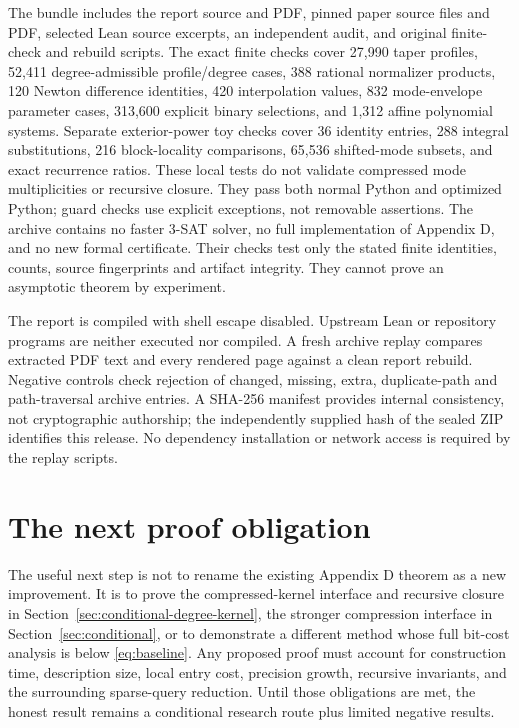\documentclass[11pt,letterpaper]{article}
\theoremstyle{remark}\newtheorem*{scope}{Scope}
\begin{document}
The bundle includes the report source and PDF, pinned paper source files and PDF, selected Lean source excerpts, an independent audit, and original finite-check and rebuild scripts. The exact finite checks cover 27,990 taper profiles, 52,411 degree-admissible profile/degree cases, 388 rational normalizer products, 120 Newton difference identities, 420 interpolation values, 832 mode-envelope parameter cases, 313,600 explicit binary selections, and 1,312 affine polynomial systems. Separate exterior-power toy checks cover 36 identity entries, 288 integral substitutions, 216 block-locality comparisons, 65,536 shifted-mode subsets, and exact recurrence ratios. These local tests do not validate compressed mode multiplicities or recursive closure. They pass both normal Python and optimized Python; guard checks use explicit exceptions, not removable assertions. The archive contains no faster 3-SAT solver, no full implementation of Appendix D, and no new formal certificate. Their checks test only the stated finite identities, counts, source fingerprints and artifact integrity. They cannot prove an asymptotic theorem by experiment.

The report is compiled with shell escape disabled. Upstream Lean or repository programs are neither executed nor compiled. A fresh archive replay compares extracted PDF text and every rendered page against a clean report rebuild. Negative controls check rejection of changed, missing, extra, duplicate-path and path-traversal archive entries. A SHA-256 manifest provides internal consistency, not cryptographic authorship; the independently supplied hash of the sealed ZIP identifies this release. No dependency installation or network access is required by the replay scripts.

\section{The next proof obligation}
The useful next step is not to rename the existing Appendix D theorem as a new improvement. It is to prove the compressed-kernel interface and recursive closure in Section~\ref{sec:conditional-degree-kernel}, the stronger compression interface in Section~\ref{sec:conditional}, or to demonstrate a different method whose full bit-cost analysis is below \eqref{eq:baseline}. Any proposed proof must account for construction time, description size, local entry cost, precision growth, recursive invariants, and the surrounding sparse-query reduction. Until those obligations are met, the honest result remains a conditional research route plus limited negative results.
\end{document}
